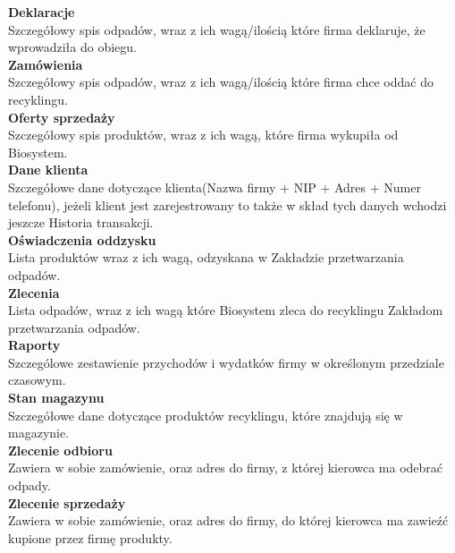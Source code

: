 \textbf{Deklaracje}\\
Szczegółowy spis odpadów, wraz z ich wagą/ilością które firma deklaruje, że wprowadziła do obiegu.\\
\textbf{Zamówienia}\\
Szczegółowy spis odpadów, wraz z ich wagą/ilością które firma chce oddać do recyklingu.\\
\textbf{Oferty sprzedaży}\\
Szczegółowy spis produktów, wraz z ich wagą, które firma wykupiła od Biosystem.\\
\textbf{Dane klienta}\\
Szczegółowe dane dotyczące klienta(Nazwa firmy + NIP + Adres + Numer telefonu), jeżeli klient jest zarejestrowany to także w skład tych danych wchodzi jeszcze Historia transakcji.\\
\textbf{Oświadczenia oddzysku}\\
Lista produktów wraz z ich wagą, odzyskana w Zakładzie przetwarzania odpadów.\\
\textbf{Zlecenia}\\
Lista odpadów, wraz z ich wagą które Biosystem zleca do recyklingu Zakładom przetwarzania odpadów.\\
\textbf{Raporty}\\
Szczególowe zestawienie przychodów i wydatków firmy w określonym przedziale czasowym.\\
\textbf{Stan magazynu}\\
Szczegółowe dane dotyczące produktów recyklingu, które znajdują się w magazynie.\\
\textbf{Zlecenie odbioru}\\
Zawiera w sobie zamówienie, oraz adres do firmy, z której kierowca ma odebrać odpady.\\
\textbf{Zlecenie sprzedaży}\\
Zawiera w sobie zamówienie, oraz adres do firmy, do której kierowca ma zawieźć kupione przez firmę produkty.\\